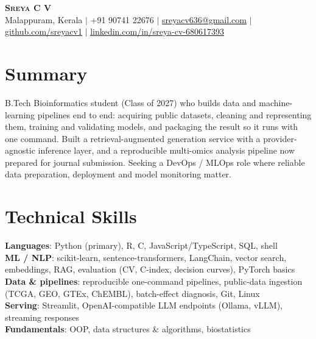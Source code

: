 \documentclass[letterpaper,10.5pt]{article}
\begin{document}
\begin{center}
    \textbf{\Huge \scshape Sreya C V} \\ \vspace{1pt}
    \small Malappuram, Kerala $|$ +91 90741 22676 $|$ \href{mailto:sreyacv636@gmail.com}{\underline{sreyacv636@gmail.com}} $|$
    \href{https://github.com/sreyacv1}{\underline{github.com/sreyacv1}} $|$
    \href{https://linkedin.com/in/sreya-cv-680617393}{\underline{linkedin.com/in/sreya-cv-680617393}}
\end{center}

\section{Summary}
\small{B.Tech Bioinformatics student (Class of 2027) who builds data and machine-learning pipelines end to end: acquiring public datasets, cleaning and representing them, training and validating models, and packaging the result so it runs with one command. Built a retrieval-augmented generation service with a provider-agnostic inference layer, and a reproducible multi-omics analysis pipeline now prepared for journal submission. Seeking a DevOps / MLOps role where reliable data preparation, deployment and model monitoring matter.}

\section{Technical Skills}
 \begin{itemize}[leftmargin=0.15in, label={}]
    \small{\item{
     \textbf{Languages}{: Python (primary), R, C, JavaScript/TypeScript, SQL, shell} \\
     \textbf{ML / NLP}{: scikit-learn, sentence-transformers, LangChain, vector search, embeddings, RAG, evaluation (CV, C-index, decision curves), PyTorch basics} \\
     \textbf{Data \& pipelines}{: reproducible one-command pipelines, public-data ingestion (TCGA, GEO, GTEx, ChEMBL), batch-effect diagnosis, Git, Linux} \\
     \textbf{Serving}{: Streamlit, OpenAI-compatible LLM endpoints (Ollama, vLLM), streaming responses} \\
     \textbf{Fundamentals}{: OOP, data structures \& algorithms, biostatistics}
    }}
 \end{itemize}
\end{document}
